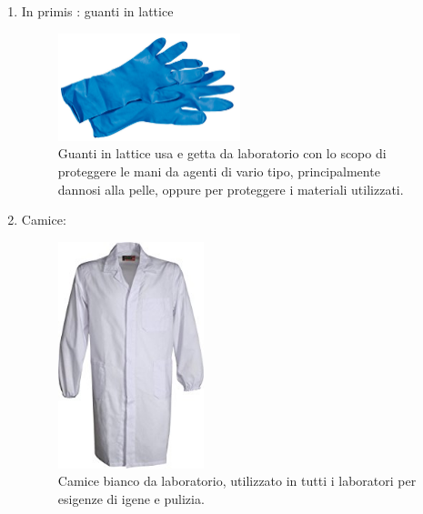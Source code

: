 \documentclass{article}
\begin{document}
	\begin{enumerate}

		\item In primis : guanti in lattice

		\begin{figure}[H]

			\includegraphics[width=0.5\textwidth]{./immagini/guanti.jpg}
			\caption{Guanti in lattice usa e getta da laboratorio con lo scopo di proteggere le mani da agenti di vario tipo,
			principalmente dannosi alla pelle,
			oppure per proteggere i materiali utilizzati.}
			\label{guanti}

		\end{figure}

		\vspace{0.5cm}


		\item Camice:

		\begin{figure}[H]

			\includegraphics[width=0.4\textwidth]{./immagini/camice.jpg}
			\caption{Camice bianco da laboratorio, utilizzato in tutti i laboratori per esigenze di igene e pulizia.}
			\label{camice}

		\end{figure}

		\vspace{0.5cm}



\end{enumerate}
\end{document}

